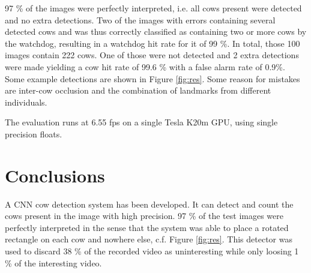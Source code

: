 \documentclass[10pt,a4paper,twocolumn]{article}
\begin{document}
97 \% of the images were perfectly interpreted, i.e. all cows present were detected and no extra detections. Two of the images with errors containing several detected cows and was thus correctly classified as containing two or more cows by the watchdog, resulting in a watchdog hit rate for it of 99 \%. In total, those 100 images contain 222 cows. One of those were not detected and 2 extra detections were made yielding a cow hit rate of 99.6 \% with a false alarm rate of 0.9\%. Some example detections are shown in Figure \ref{fig:res}.
Some reason for mistakes are inter-cow occlusion and the combination of landmarks from different individuals.

The evaluation runs at 6.55 fps on a single Tesla K20m GPU, using single precision floats.

\section{Conclusions}

A CNN cow detection system has been developed. It can detect and count the cows present in the image with high precision. 97 \% of the test images were perfectly interpreted in the sense that the system was able to place a rotated rectangle on each cow and nowhere else, c.f. Figure \ref{fig:res}. This detector was used to discard 38 \% of the recorded video as uninteresting while only loosing 1 \% of the interesting video.



\end{document}
